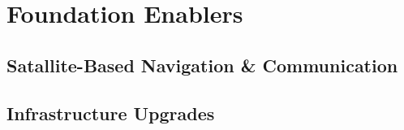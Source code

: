 \section{Foundation Enablers}






\subsection{Satallite-Based Navigation \& Communication}





\subsection{Infrastructure Upgrades}







